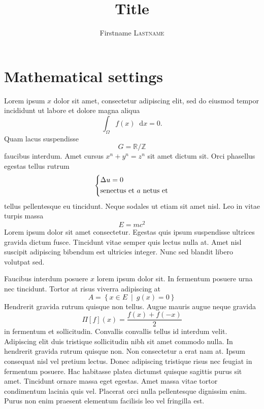 \documentclass[12pt,a4paper]{article}
\title{Title}
\author{Firstname \textsc{Lastname}}
\date{}
\newcommand{\bbR}{\mathbb{R}}
\newcommand{\bbZ}{\mathbb{Z}}
\newcommand{\di}[1]{\mathop{}\!\mathrm{d}#1}
\newcommand{\setst}[2]{\left\lbrace#1\ \middle\vert\ #2\right\rbrace}
\theoremstyle{definition}
\theoremstyle{plain}
\theoremstyle{remark}
\begin{document}
\maketitle

\tableofcontents


\section{Mathematical settings}

Lorem ipsum $x$ dolor sit amet, consectetur adipiscing elit, sed do eiusmod tempor incididunt ut labore et dolore magna aliqua
$$
    \int_\Omega f(x) \di{x} = 0.
$$
Quam lacus suspendisse $$G = \bbR / \bbZ$$ faucibus interdum.
Amet cursus
$
    x^n + y^n = z^n
$
sit amet dictum sit.
Orci phasellus egestas tellus rutrum
$$
    \begin{dcases}
        \Delta u = 0 \\
        \text{senectus et $a$ netus et}
    \end{dcases}
$$
tellus pellentesque eu tincidunt. Neque sodales ut etiam sit amet nisl.
Leo in vitae turpis massa
$$
    E = m c^2 %
$$
Lorem ipsum dolor sit amet consectetur.
Egestas quis ipsum suspendisse ultrices gravida dictum fusce.
Tincidunt vitae semper quis lectus nulla at.
Amet nisl suscipit adipiscing bibendum est ultricies integer.
Nunc sed blandit libero volutpat sed.

Faucibus interdum posuere \(x\) lorem ipsum dolor sit.
In fermentum posuere urna nec tincidunt.
Tortor at risus viverra adipiscing at
\[
    A = \setst{x \in E}{g(x) = 0} %
\]
Hendrerit gravida rutrum quisque non tellus.
Augue mauris augue neque gravida \[\Pi[f](x) = \frac{f(x) + f(-x)}{2}\] in fermentum et sollicitudin.
Convallis convallis tellus id interdum velit.
Adipiscing elit duis tristique sollicitudin nibh sit amet commodo nulla.
In hendrerit gravida rutrum quisque non.
Non consectetur a erat nam at.
Ipsum consequat nisl vel pretium lectus.
Donec adipiscing tristique risus nec feugiat in fermentum posuere.
Hac habitasse platea dictumst quisque sagittis purus sit amet.
Tincidunt ornare massa eget egestas.
Amet massa vitae tortor condimentum lacinia quis vel.
Placerat orci nulla pellentesque dignissim enim.
Purus non enim praesent elementum facilisis leo vel fringilla est.
\end{document}
